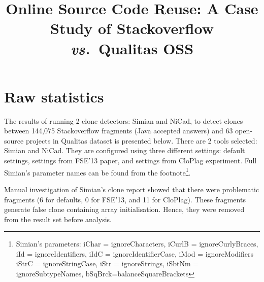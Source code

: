 \documentclass{IEEEtran}
\begin{document}
\onecolumn

\title{Online Source Code Reuse: A Case Study of Stackoverflow \textit{vs.~}Qualitas OSS}
\maketitle

\section*{Raw statistics}
The results of running 2 clone detectors: Simian and NiCad, to detect clones between 144,075 Stackoverflow fragments (Java accepted answers) and 63 open-source projects in Qualitas dataset is presented below. There are 2 tools selected: Simian and NiCad. They are configured using three different settings: default settings, settings from FSE'13 paper, and settings from CloPlag experiment. Full Simian's parameter names can be found from the footnote\footnote{Simian's parameters: iChar = ignoreCharacters, iCurlB = ignoreCurlyBraces, iId = ignoreIdentifiers, iIdC = ignoreIdentifierCase, iMod = ignoreModifiers \newline iStrC = ignoreStringCase, iStr = ignoreStrings, iSbtNm = ignoreSubtypeNames, bSqBrck=balanceSquareBrackets}.

Manual investigation of Simian's clone report showed that there were problematic fragments (6 for defaults, 0 for FSE'13, and 11 for CloPlag). These fragments generate false clone containing array initialisation. Hence, they were removed from the result set before analysis.
\end{document}

